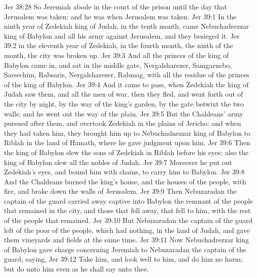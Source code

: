 \vs Jer 38:28 So Jeremiah abode in the court of the prison until the day that Jerusalem was taken: and he was  when Jerusalem was taken.
\vs Jer 39:1 In the ninth year of Zedekiah king of Judah, in the tenth month, came Nebuchadrezzar king of Babylon and all his army against Jerusalem, and they besieged it.
\vs Jer 39:2  in the eleventh year of Zedekiah, in the fourth month, the ninth  of the month, the city was broken up.
\vs Jer 39:3 And all the princes of the king of Babylon came in, and sat in the middle gate,  Nergalsharezer, Samgarnebo, Sarsechim, Rabsaris, Nergalsharezer, Rabmag, with all the residue of the princes of the king of Babylon.
\vs Jer 39:4 And it came to pass,  when Zedekiah the king of Judah saw them, and all the men of war, then they fled, and went forth out of the city by night, by the way of the king's garden, by the gate betwixt the two walls: and he went out the way of the plain.
\vs Jer 39:5 But the Chaldeans' army pursued after them, and overtook Zedekiah in the plains of Jericho: and when they had taken him, they brought him up to Nebuchadnezzar king of Babylon to Riblah in the land of Hamath, where he gave judgment upon him.
\vs Jer 39:6 Then the king of Babylon slew the sons of Zedekiah in Riblah before his eyes: also the king of Babylon slew all the nobles of Judah.
\vs Jer 39:7 Moreover he put out Zedekiah's eyes, and bound him with chains, to carry him to Babylon.
\vs Jer 39:8 And the Chaldeans burned the king's house, and the houses of the people, with fire, and brake down the walls of Jerusalem.
\vs Jer 39:9 Then Nebuzaradan the captain of the guard carried away captive into Babylon the remnant of the people that remained in the city, and those that fell away, that fell to him, with the rest of the people that remained.
\vs Jer 39:10 But Nebuzaradan the captain of the guard left of the poor of the people, which had nothing, in the land of Judah, and gave them vineyards and fields at the same time.
\vs Jer 39:11 Now Nebuchadrezzar king of Babylon gave charge concerning Jeremiah to Nebuzaradan the captain of the guard, saying,
\vs Jer 39:12 Take him, and look well to him, and do him no harm; but do unto him even as he shall say unto thee.
